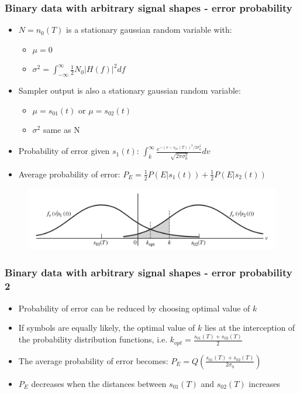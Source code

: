 \documentclass{beamer}
\begin{document}
	\begin{frame}
		\frametitle{Binary data with arbitrary signal shapes - error probability}
		\begin{itemize}
			\item $N = n_0(T)$ is a stationary gaussian random variable with:
			\begin{itemize}
				\item $\mu = 0$
				\item $\sigma^2 = \int_{-\infty}^{\infty} \frac{1}{2}N_0|H(f)|^2 df$
			\end{itemize}
			\item Sampler output is also a stationary gaussian random variable:
			\begin{itemize}
				\item $\mu = s_{01}(t)$ or $\mu = s_{02}(t)$
				\item $\sigma^2$ same as N
			\end{itemize}
			\item Probability of error given $s_1(t)$: $ \int_k^{\infty}{\frac{e^{-(v-s_{01}(T))^2 / 2\sigma_0^2}}{\sqrt{2\pi\sigma_0^2}} dv} $
			\item Average probability of error: $ P_E = \frac{1}{2}P(E|s_1(t)) + \frac{1}{2}P(E|s_2(t)) $
		\end{itemize}
		\begin{figure}
			\includegraphics[width=\textwidth,keepaspectratio,center]{prob_distr.png}
		\end{figure}
	\end{frame}

	\begin{frame}
		\frametitle{Binary data with arbitrary signal shapes - error probability 2}
		\begin{itemize}
			\item Probability of error can be reduced by choosing optimal value of $k$
			\item If symbols are equally likely, the optimal value of $k$ lies at the interception of the probability distribution functions, i.e. $ k_{opt} = \frac{s_{01}(T) + s_{02}(T)}{2} $
			\item The average probability of error becomes: $ P_E = Q(\frac{s_{01}(T) + s_{02}(T)}{2\sigma_0}) $
			\item $ P_E $ decreases when the distances between $s_{01}(T)$ and $s_{02}(T)$ increases
		\end{itemize}
	\end{frame}
\end{document}
